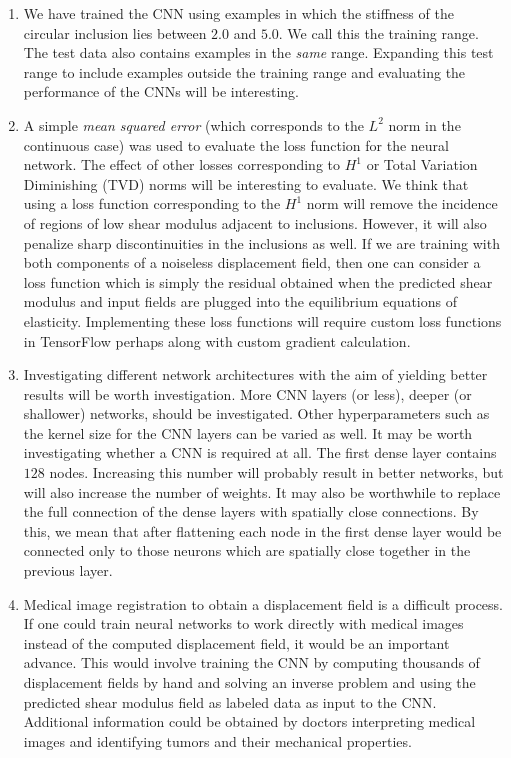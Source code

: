 \documentclass[12pt]{article}
\begin{document}
\begin{enumerate}
\item{We have trained the CNN using examples in which the stiffness of the circular inclusion lies between $2.0$ and $5.0$. We call this the training range. The test data also contains examples in the \textit{same} range. Expanding this test range to include examples outside the training range and evaluating the performance of the CNNs will be interesting.}
\item{A simple \textit{mean squared error} (which corresponds to the $L^2$ norm in the continuous case) was used to evaluate the loss function for the neural network. The effect of other losses corresponding to $H^1$ or Total Variation Diminishing (TVD) norms will be interesting to evaluate. We think that using a loss function corresponding to the $H^1$ norm will remove the incidence of regions of low shear modulus adjacent to inclusions. However, it will also penalize sharp discontinuities in the inclusions as well. If we are training with both components of a noiseless displacement field, then one can consider a loss function which is simply the residual obtained when the predicted shear modulus and input fields are plugged into the equilibrium equations of elasticity. Implementing these loss functions will require custom loss functions in TensorFlow perhaps along with custom gradient calculation.}
\item{Investigating different network architectures with the aim of yielding better results will be worth investigation. More CNN layers (or less), deeper (or shallower) networks, should be investigated. Other hyperparameters such as the kernel size for the CNN layers can be varied as well. It may be worth investigating whether a CNN is required at all. The first dense layer contains $128$ nodes. Increasing this number will probably result in better networks, but will also increase the number of weights. It may also be worthwhile to replace the full connection of the dense layers with spatially close connections. By this, we mean that after flattening each node in the first dense layer would be connected only to those neurons which are spatially close together in the previous layer.}
\item{Medical image registration to obtain a displacement field is a difficult process. If one could train neural networks to work directly with medical images instead of the computed displacement field, it would be an important advance. This would involve training the CNN by computing thousands of displacement fields by hand and solving an inverse problem and using the predicted shear modulus field as labeled data as input to the CNN. Additional information could be obtained by doctors interpreting medical images and identifying tumors and their mechanical properties.}

\end{enumerate}
\end{document}
